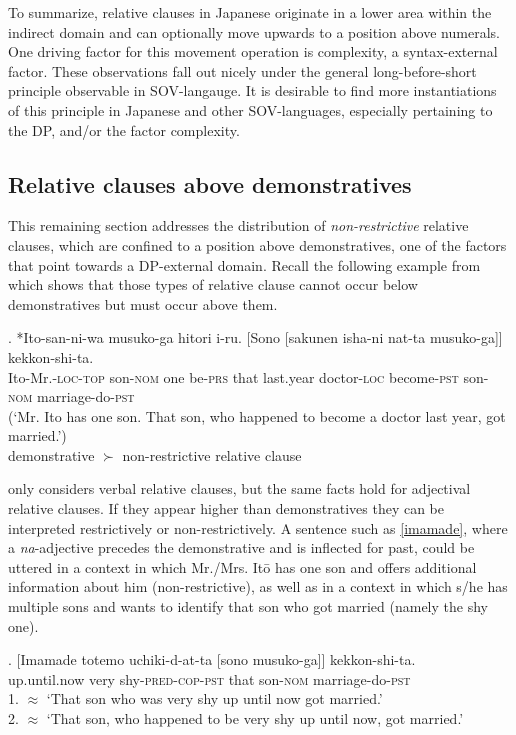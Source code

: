\documentclass [output=book,colorlinks,citecolor=brown]{langscibook}
\begin{document}
To summarize, relative clauses in Japanese originate in a lower area within the indirect domain and can optionally move upwards to a position above numerals. One driving factor for this movement operation is complexity, a syntax-external factor. These observations fall out nicely under the general long-before-short principle observable in SOV-langauge. It is desirable to find more instantiations of this principle in Japanese and other SOV-languages, especially pertaining to the DP, and/or the factor complexity. %

\subsection{Relative clauses above demonstratives} \label{RCs above dem}

This remaining section addresses the distribution of \textit{non-restrictive} relative clauses, which are confined to a position above demonstratives, one of the factors that point towards a DP-external domain. Recall the following example from \citet{ishizuka:2008:RC} which shows that those types of relative clause cannot occur below demonstratives but must occur above them. %

\exg. *Ito-san-ni-wa musuko-ga hitori i-ru. [Sono [sakunen isha-ni nat-ta musuko-ga]] kekkon-shi-ta.\\
Ito-Mr.-\textsc{loc-top} son-\textsc{nom} one be-\textsc{prs} that last.year doctor-\textsc{loc} become-\textsc{pst} son-\textsc{nom} marriage-do-\textsc{pst}\\
(`Mr. Ito has one son. That son, who happened to become a doctor last year, got married.’) \\ \null \hfill *demonstrative $\succ$ non-restrictive relative clause \citep[5]{ishizuka:2008:RC}

\citet{ishizuka:2008:RC} only considers verbal relative clauses, but the same facts hold for adjectival relative clauses. If they appear higher than demonstratives they can be interpreted restrictively or non-restrictively. A sentence such as \ref{imamade}, where a \textit{na}-adjective precedes the demonstrative and is inflected for past, could be uttered in a context in which Mr./Mrs. Itō has one son and offers additional information about him (non-restrictive), as well as in a context in which s/he has multiple sons and wants to identify that son who got married (namely the shy one).

\exg. [Imamade totemo uchiki-d-at-ta [sono musuko-ga]] kekkon-shi-ta.\\
up.until.now very shy-\textsc{pred-cop-pst} that son-\textsc{nom} marriage-do-\textsc{pst}\\
1. $\approx$ `That son who was very shy up until now got married.’ \\
2. $\approx$ `That son, who happened to be very shy up until now, got married.’ \label{imamade}
\end{document}
